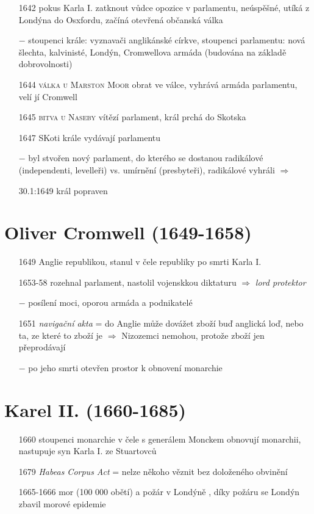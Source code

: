 \documentclass{article}
\begin{document}
\begin{itemize}
    \item[1642] pokus Karla I. zatknout vůdce opozice v parlamentu, neúspěšné, utíká z Londýna do Osxfordu, začíná otevřená občanská válka
    \item[$-$] stoupenci krále: vyznavači anglikánské církve, stoupenci parlamentu: nová šlechta, kalvinisté, Londýn, Cromwellova armáda (budována na základě dobrovolnosti)
    \item[1644] \textsc{válka u Marston Moor} obrat ve válce, vyhrává armáda parlamentu, velí jí Cromwell
    \item[1645] \textsc{bitva u Naseby} vítězí parlament, král prchá do Skotska
    \item[1647] SKoti krále vydávají parlamentu
    \item[$-$] byl stvořen nový parlament, do kterého se dostanou radikálové (independenti, levelleři) vs. umírnění (presbyteři), radikálové vyhráli $\Rightarrow$
    \item[30.1:1649] král popraven
\end{itemize}

\section*{Oliver Cromwell (1649-1658)}
\begin{itemize}
    \vspace{-0.5em}
    \setlength\itemsep{0.15em}
    \item[1649] Anglie republikou, stanul v čele republiky po smrti Karla I.
    \item[1653-58]  rozehnal parlament, nastolil vojenskkou diktaturu $\Rightarrow$ \textit{lord protektor}
    \item[$-$] posílení moci, oporou armáda a podnikatelé
    \item[1651] \textit{navigační akta} = do Anglie může dovážet zboží buď anglická loď, nebo ta, ze které to zboží je $\Rightarrow$ Nizozemci nemohou, protože zboží jen přeprodávají
    \item[$-$] po jeho smrti otevřen prostor k obnovení monarchie
\end{itemize}

\section*{Karel II. (1660-1685)}
\begin{itemize}
    \vspace{-0.5em}
    \setlength\itemsep{0.15em}
    \item[1660] stoupenci monarchie v čele s generálem Monckem obnovují monarchii, nastupuje syn Karla I. ze Stuartovců
    \item[1679] \textit{Habeas Corpus Act} = nelze někoho věznit bez doloženého obvinění
    \item[1665-1666] mor (100 000 obětí) a požár v Londýně , díky požáru se Londýn zbavil morové epidemie
\end{itemize}
\end{document}
